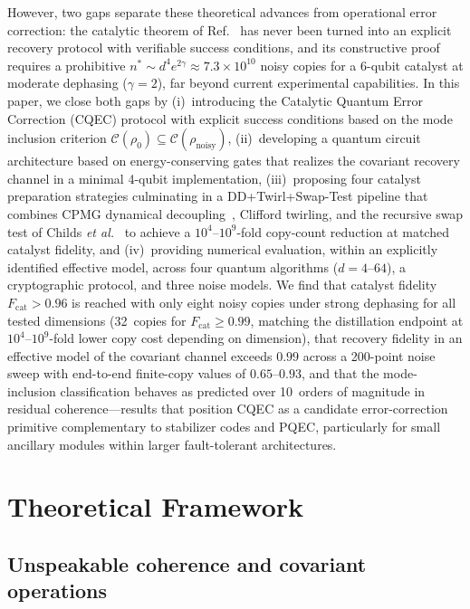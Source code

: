 \documentclass[a4paper,twocolumn]{quantumarticle}
\begin{document}
However, two gaps separate these theoretical advances from operational error correction: the catalytic theorem of Ref.~\cite{Shiraishi2024} has never been turned into an explicit recovery protocol with verifiable success conditions, and its constructive proof requires a prohibitive $n^* \sim d^4 e^{2\gamma} \approx 7.3 \times 10^{10}$ noisy copies for a 6-qubit catalyst at moderate dephasing ($\gamma = 2$), far beyond current experimental capabilities.
In this paper, we close both gaps by (i)~introducing the Catalytic Quantum Error Correction (CQEC) protocol with explicit success conditions based on the mode inclusion criterion $\mathcal{C}(\rho_0) \subseteq \mathcal{C}(\rho_\mathrm{noisy})$, (ii)~developing a quantum circuit architecture based on energy-conserving gates that realizes the covariant recovery channel in a minimal 4-qubit implementation, (iii)~proposing four catalyst preparation strategies culminating in a DD+Twirl+Swap-Test pipeline that combines CPMG dynamical decoupling~\cite{Viola1999,MeiboomGill1958}, Clifford twirling, and the recursive swap test of Childs \emph{et al.}~\cite{Childs2025,Yao2025,Zhao2026} to achieve a $10^{4}$--$10^{9}$-fold copy-count reduction at matched catalyst fidelity, and (iv)~providing numerical evaluation, within an explicitly identified effective model, across four quantum algorithms ($d = 4$--$64$), a cryptographic protocol, and three noise models.
We find that catalyst fidelity $F_\mathrm{cat} > 0.96$ is reached with only eight noisy copies under strong dephasing for all tested dimensions (32~copies for $F_\mathrm{cat} \geq 0.99$, matching the distillation endpoint at $10^{4}$--$10^{9}$-fold lower copy cost depending on dimension), that recovery fidelity in an effective model of the covariant channel exceeds $0.99$ across a 200-point noise sweep with end-to-end finite-copy values of $0.65$--$0.93$, and that the mode-inclusion classification behaves as predicted over 10~orders of magnitude in residual coherence---results that position CQEC as a candidate error-correction primitive complementary to stabilizer codes and PQEC, particularly for small ancillary modules within larger fault-tolerant architectures.


\section{Theoretical Framework}
\label{sec:theory}

\subsection{Unspeakable coherence and covariant operations}
\label{sec:covariant}
\end{document}
